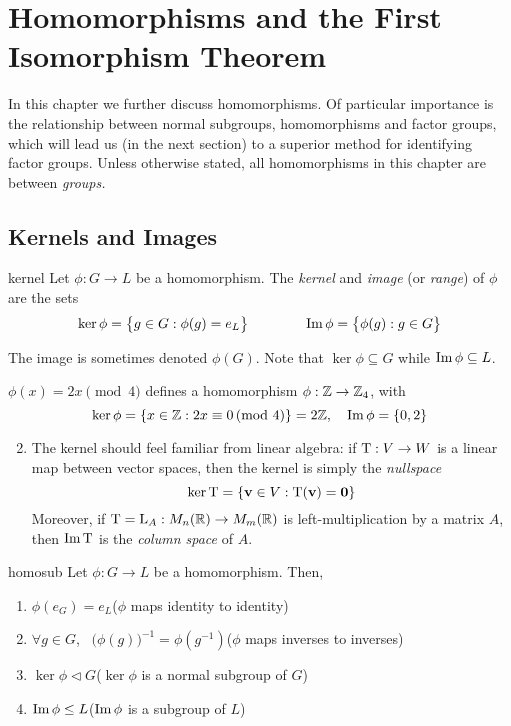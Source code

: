\graphicspath{{7homo/asy/}}

\section{Homomorphisms and the First Isomorphism Theorem}\label{chap:homo}

In this chapter we further discuss homomorphisms. Of particular importance is the relationship between normal subgroups, homomorphisms and factor groups, which will lead us (in the next section) to a superior method for identifying factor groups.\smallbreak
Unless otherwise stated, all homomorphisms in this chapter are between \emph{groups.}

\subsection{Kernels and Images}\label{sec:kerimage}

\begin{defn}{}{kernel}
	Let $\phi:G\to L$ be a homomorphism. The \emph{kernel} and \emph{image} (or \emph{range}) of $\phi$ are the sets
	\[
		\ker\phi=\bigl\{g\in G:\phi(g)=e_L\bigr\}
		\qquad\qquad
		\operatorname{Im}\phi=\bigl\{\phi(g):g\in G\bigr\}
	\]
\end{defn}

The image is sometimes denoted $\phi(G)$. Note that $\ker\phi\subseteq G$ while $\operatorname{Im}\phi\subseteq L$.

\begin{examples}{}{}
	\exstart $\phi(x)=2x\pmod 4$ defines a homomorphism $\phi:\mathbb{Z}\to\mathbb{Z}_4$, with
	\[
		\ker\phi=\{x\in\mathbb{Z}:2x\equiv 0\negthickspace\pmod 4\}=2\mathbb{Z},
		\quad
		\operatorname{Im}\phi=\{0,2\}
	\]
	\begin{enumerate}\setcounter{enumi}{1}
	  \item The kernel should feel familiar from linear algebra: if $\mathrm{T}:V\to W$ is a linear map between vector spaces, then the kernel is simply the \emph{nullspace}
		\[
			\ker\mathrm{T}=\{{\mathbf{v}}\in V:\mathrm{T}({\mathbf{v}})=\mathbf{0}\}
		\]
		Moreover, if $\mathrm{T}=\mathrm{L}_A:M_n(\mathbb{R})\to M_m(\mathbb{R})$ is left-multiplication by a matrix $A$, then $\operatorname{Im}\mathrm{T}$ is the \emph{column space} of $A$.
	\end{enumerate}
\end{examples}


\begin{lemm}{}{homosub}
	Let $\phi:G\to L$ be a homomorphism. Then,
	\begin{enumerate}
	  \item $\phi(e_G)=e_L$\hfill ($\phi$ maps identity to identity)
	  \item $\forall g\in G$, \ $\bigl(\phi(g)\bigr)^{-1}=\phi(g^{-1})$\hfill($\phi$ maps inverses to inverses)
	  \item $\ker\phi\triangleleft G$\hfill($\ker\phi$ is a normal subgroup of $G$)
	  \item $\operatorname{Im}\phi\le L$\hfill($\operatorname{Im}\phi$ is a subgroup of $L$)
	\end{enumerate}
\end{lemm}

